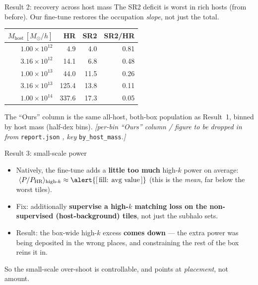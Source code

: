 \documentclass[aspectratio=169]{beamer}
\begin{document}
\begin{frame}{Result 2: recovery across host mass}
\small
The SR2 deficit is worst in rich hosts (from before). Our fine-tune restores the
occupation \emph{slope}, not just the total.
\vspace{0.15cm}

\centering
\begin{tabular}{r r r r}
\hline
$M_{\mathrm{host}}\,[M_\odot/h]$ & HR & SR2 & SR2/HR \\
\hline
$1.00\times10^{12}$ & 4.9   & 4.0  & 0.81 \\
$3.16\times10^{12}$ & 14.1  & 6.8  & 0.48 \\
$1.00\times10^{13}$ & 44.0  & 11.5 & 0.26 \\
$3.16\times10^{13}$ & 125.4 & 13.8 & 0.11 \\
$1.00\times10^{14}$ & 337.6 & 17.3 & \alert{0.05} \\
\hline
\end{tabular}

\vspace{0.25cm}
{\footnotesize The ``Ours'' column is the same all-host, both-box population as
Result~1, binned by host mass (half-dex bins).
\textit{[per-bin ``Ours'' column / figure to be dropped in from} \texttt{report.json}
\textit{, key} \texttt{by\_host\_mass}\textit{.]}}
\end{frame}

\begin{frame}{Result 3: small-scale power}
\small
\begin{itemize}
    \item Natively, the fine-tune adds a \textbf{little too much} high-$k$ power
          on average: $\;\langle P/P_{\mathrm{HR}}\rangle_{\text{high-}k}\approx
          \alert{[\,\text{fill: avg value}\,]}$ (this is the \emph{mean}, far
          below the worst tiles).
    \item Fix: additionally \textbf{supervise a high-$k$ matching loss on the
          non-supervised (host-background) tiles}, not just the subhalo sets.
    \item Result: the box-wide high-$k$ excess \textbf{comes down} --- the extra
          power was being deposited in the wrong places, and constraining the
          rest of the box reins it in.
\end{itemize}
\vspace{0.15cm}
\begin{block}{}
So the small-scale over-shoot is controllable, and points at \emph{placement},
not amount.
\end{block}
\end{frame}
\end{document}
